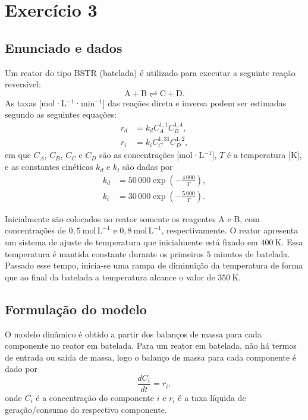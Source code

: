 \documentclass{article}
\begin{document}
\section{Exercício 3}

\subsection*{Enunciado e dados}
Um reator do tipo BSTR (batelada) é utilizado para executar a seguinte reação reversível:
\begin{equation*}
  \mathrm{A} + \mathrm{B} \rightleftharpoons \mathrm{C} + \mathrm{D}.
\end{equation*}
As taxas [mol·L$^{-1}$·min$^{-1}$] das reações direta e inversa podem ser estimadas segundo as seguintes equações:
\begin{align}
  r_d &= k_d C_A^{1{,}1} C_B^{1{,}4}, \label{eq:rd-q3} \\
  r_i &= k_i C_C^{1{,}31} C_D^{1{,}2}, \label{eq:ri-q3}
\end{align}
em que $C_A$, $C_B$, $C_C$ e $C_D$ são as concentrações [mol·L$^{-1}$], $T$ é a temperatura [K], e as constantes cinéticas $k_d$ e $k_i$ são dadas por
\begin{align}
  k_d &= 50\,000 \exp\left(-\frac{4\,000}{T}\right), \label{eq:kd-q3} \\
  k_i &= 30\,000 \exp\left(-\frac{5\,000}{T}\right). \label{eq:ki-q3}
\end{align}

Inicialmente são colocados no reator somente os reagentes A e B, com concentrações de $0{,}5\ \mathrm{mol\,L^{-1}}$ e $0{,}8\ \mathrm{mol\,L^{-1}}$, respectivamente. O reator apresenta um sistema de ajuste de temperatura que inicialmente está fixado em $400\ \mathrm{K}$. Essa temperatura é mantida constante durante os primeiros $5$ minutos de batelada. Passado esse tempo, inicia-se uma rampa de diminuição da temperatura de forma que ao final da batelada a temperatura alcance o valor de $350\ \mathrm{K}$.

\subsection*{Formulação do modelo}

O modelo dinâmico é obtido a partir dos balanços de massa para cada componente no reator em batelada. Para um reator em batelada, não há termos de entrada ou saída de massa, logo o balanço de massa para cada componente é dado por
\begin{equation*}
  \frac{dC_i}{dt} = r_i,
\end{equation*}
onde $C_i$ é a concentração do componente $i$ e $r_i$ é a taxa líquida de geração/consumo do respectivo componente.
\end{document}
